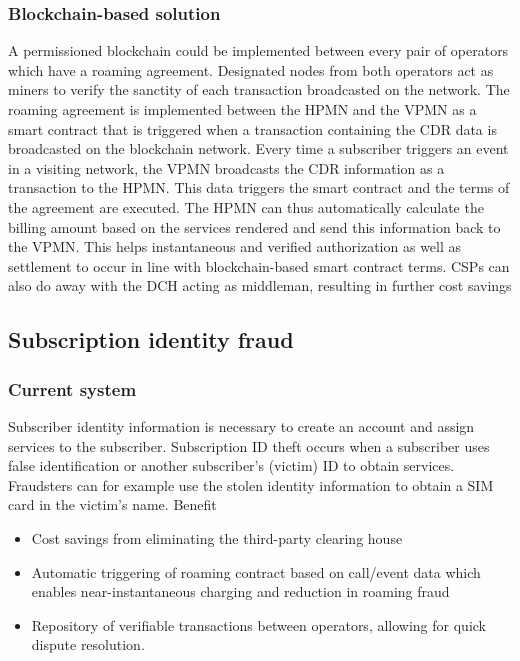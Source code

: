 \documentclass[12pt]{article}
\begin{document}
\subsubsection{Blockchain-based solution}
A permissioned blockchain could
be implemented between every
pair of operators which have a roaming
agreement. Designated nodes from both
operators act as miners to verify the sanctity
of each transaction broadcasted on the
network. The roaming agreement is implemented between the HPMN and the VPMN
as a smart contract that is triggered when
a transaction containing the CDR data is
broadcasted on the blockchain network.
Every time a subscriber triggers an event
in a visiting network, the VPMN broadcasts
the CDR information as a transaction to
the HPMN. This data triggers the smart
contract and the terms of the agreement
are executed. The HPMN can thus automatically calculate the billing amount based
on the services rendered and send this
information back to the VPMN.
This helps instantaneous and verified authorization as well as settlement to occur in
line with blockchain-based smart contract
terms. CSPs can also do away with the DCH
acting as middleman, resulting in further
cost savings



\subsection{Subscription identity fraud}
\subsubsection{Current system}



\noindent  Subscriber identity information is necessary to create an account
and assign services to the subscriber.
Subscription ID theft occurs when a subscriber uses false identification or another
subscriber’s (victim) ID to obtain services.
Fraudsters can for example use the stolen
identity information to obtain a SIM card in
the victim’s name.
\leftboxbegin
Benefit
\begin{itemize}
	\item Cost savings from eliminating the
	third-party clearing house
	\item Automatic triggering of roaming
	contract based on call/event data
	which enables near-instantaneous charging and reduction in
	roaming fraud
	\item Repository of verifiable transactions
	between operators, allowing
	for quick dispute resolution.
\end{itemize}
\leftboxend
\end{document}
